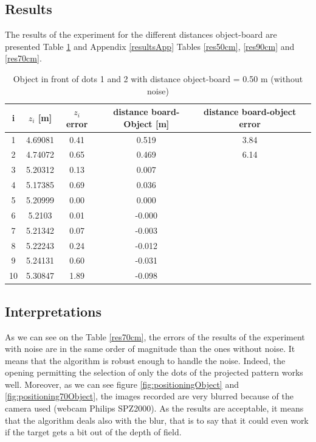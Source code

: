 \subsection{Results}
The results of the experiment for the different distances object-board are presented Table \ref{res50cm2} and Appendix \ref{resultsApp} Tables \ref{res50cm}, \ref{res90cm} and \ref{res70cm}.


\begin{table}[H]
\centering
\caption{Object in front of dots 1 and 2 with distance object-board = 0.50 m (without noise)}
\label{res50cm2}
\renewcommand{\arraystretch}{1.5}
\begin{tabular}{|c|c|c|c|c|c|}
\hline
i & $z_i$ [m] & $z_i$ error\footnotemark[1] [\%] & distance board-Object [m] & distance board-object error\footnotemark[1] [\%] \\
\hline
1 & 4.69081 & 0.41 & 0.519 & 3.84 \\
\hline
2 & 4.74072 & 0.65 & 0.469 & 6.14 \\
\hline
3 & 5.20312 & 0.13 & 0.007 & \\
\hline
4 & 5.17385 & 0.69 & 0.036 & \\
\hline
5 & 5.20999 & 0.00 & 0.000 & \\
\hline
6 & 5.2103 & 0.01 & -0.000 & \\
\hline 
7 & 5.21342 & 0.07 & -0.003 & \\
\hline
8 & 5.22243 & 0.24 & -0.012 & \\
\hline
9 & 5.24131 & 0.60 & -0.031 & \\
\hline
10 & 5.30847 & 1.89 & -0.098 & \\
\hline
\end{tabular}
\end{table}


\subsection{Interpretations}
As we can see on the Table \ref{res70cm}, the errors of the results of the experiment with noise are in the same order of magnitude than the ones without noise. It means that the algorithm is robust enough to handle the noise. Indeed, the 
opening permitting the selection of only the dots of the projected pattern works well. Moreover, as we can see figure \ref{fig:positioningObject} and \ref{fig:positioning70Object}, the images recorded are very blurred because of the camera used (webcam Philips SPZ2000). As the results are acceptable, it means that the algorithm deals also with the blur, that is to say that it could even work if the target gets a bit out of the depth of field.

